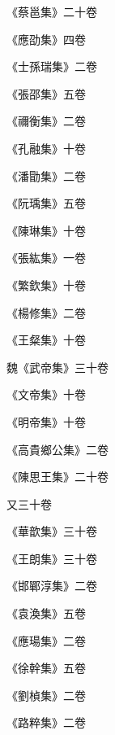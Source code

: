 \begin{pinyinscope}
 《蔡邕集》二十卷



 《應劭集》四卷



 《士孫瑞集》二卷



 《張邵集》五卷



 《禰衡集》二卷



 《孔融集》十卷



 《潘勖集》二卷



 《阮瑀集》五卷



 《陳琳集》十卷



 《張紘集》一卷



 《繁欽集》十卷



 《楊修集》二卷



 《王粲集》十卷



 魏《武帝集》三十卷



 《文帝集》十卷



 《明帝集》十卷



 《高貴鄉公集》二卷



 《陳思王集》二十卷



 又三十卷



 《華歆集》三十卷



 《王朗集》三十卷



 《邯鄲淳集》二卷



 《袁渙集》五卷



 《應瑒集》二卷



 《徐幹集》五卷



 《劉楨集》二卷



 《路粹集》二卷




\end{pinyinscope}
